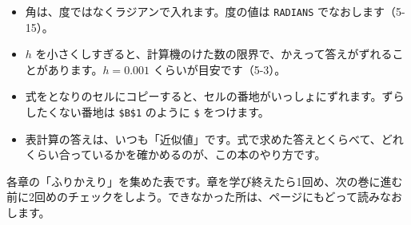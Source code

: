 \begin{itemize}[leftmargin=1.4\zw, itemsep=2pt, topsep=2pt, label={\color{bkTheme}●}]
\item 角は、度ではなくラジアンで入れます。度の値は \texttt{RADIANS} でなおします（5-15）。
\item $h$ を小さくしすぎると、計算機のけた数の限界で、かえって答えがずれることがあります。$h=0.001$ くらいが目安です（5-3）。
\item 式をとなりのセルにコピーすると、セルの番地がいっしょにずれます。ずらしたくない番地は \texttt{\$B\$1} のように \texttt{\$} をつけます。
\item 表計算の答えは、いつも「近似値」です。式で求めた答えとくらべて、どれくらい合っているかを確かめるのが、この本のやり方です。
\end{itemize}

{\small 各章の「ふりかえり」を集めた表です。章を学び終えたら1回め、次の巻に進む前に2回めのチェックをしよう。できなかった所は、ページにもどって読みなおします。}\par\vspace{2mm}



